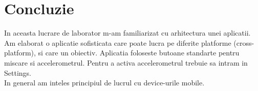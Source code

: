 \section*{Concluzie}


In aceasta lucrare de laborator m-am familiarizat cu arhitectura unei aplicatii. Am elaborat o aplicatie sofisticata care poate lucra pe diferite platforme (cross-platform), si care un obiectiv. Aplicatia foloseste butoane standarte pentru miscare si accelerometrul. Pentru a activa accelerometrul trebuie sa intram in Settings.\\
In general am inteles principiul de lucrul cu device-urile mobile.

\clearpage